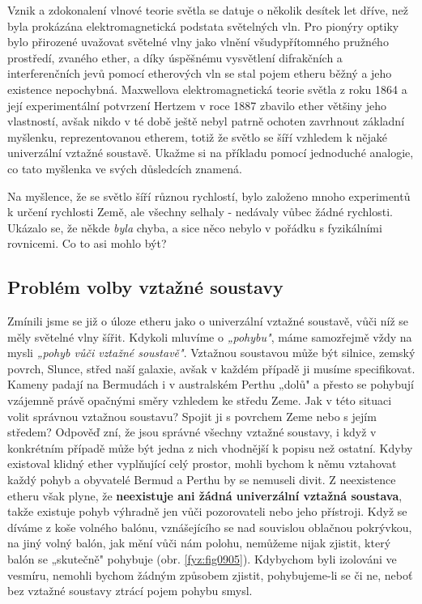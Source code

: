     \begin{tcnote}        
      Vznik a zdokonalení vlnové teorie světla se datuje o několik desítek let dříve, než byla
      prokázána elektromagnetická podstata světelných vln. Pro pionýry optiky bylo přirozené
      uvažovat světelné vlny jako vlnění všudypřítomného pružného prostředí, zvaného ether, a díky
      úspěšnému vysvětlení difrakčních a interferenčních jevů pomocí etherových vln se stal pojem
      etheru běžný a jeho existence nepochybná. Maxwellova elektromagnetická teorie světla z roku
      1864 a její experimentální potvrzení Hertzem v roce 1887 zbavilo ether většiny jeho
      vlastností, avšak nikdo v té době ještě nebyl patrně ochoten zavrhnout základní myšlenku,
      reprezentovanou etherem, totiž že světlo se šíří vzhledem k nějaké univerzální vztažné
      soustavě. Ukažme si na příkladu pomocí jednoduché analogie, co tato myšlenka ve svých
      důsledcích znamená.
    \end{tcnote}

    Na myšlence, že se světlo šíří různou rychlostí, bylo založeno mnoho experimentů k určení
    rychlosti Země, ale všechny selhaly - nedávaly vůbec žádné rychlosti. Ukázalo se, že někde
    \emph{byla} chyba, a sice něco nebylo v pořádku s fyzikálními rovnicemi. Co to asi mohlo být?

    \subsection{Problém volby vztažné soustavy}
      Zmínili jsme se již o úloze etheru jako o univerzální vztažné soustavě, vůči níž se měly
      světelné vlny šířit. Kdykoli mluvíme o \emph{„pohybu"}, máme samozřejmě vždy na mysli
      \emph{„pohyb vůči vztažné soustavě"}. Vztažnou soustavou může být silnice, zemský povrch,
      Slunce, střed naší galaxie, avšak v každém případě ji musíme specifikovat. Kameny padají na
      Bermudách i v australském Perthu „dolů" a přesto se pohybují vzájemně právě opačnými směry
      vzhledem ke středu Zeme. Jak v této situaci volit správnou vztažnou soustavu? Spojit ji s
      povrchem Zeme nebo s jejím středem? Odpověď zní, že jsou správné všechny vztažné soustavy, i
      když v konkrétním případě může být jedna z nich vhodnější k popisu než ostatní. Kdyby
      existoval klidný ether vyplňující celý prostor, mohli bychom k němu vztahovat každý pohyb a
      obyvatelé Bermud a Perthu by se nemuseli divit. Z neexistence etheru však plyne, že
      \textbf{neexistuje ani žádná univerzální vztažná soustava}, takže existuje pohyb výhradně jen
      vůči pozorovateli nebo jeho přístroji. Když se díváme z koše volného balónu, vznášejícího se
      nad souvislou oblačnou pokrývkou, na jiný volný balón, jak mění vůči nám polohu, nemůžeme
      nijak zjistit, který balón se „skutečně" pohybuje (obr. \ref{fyz:fig0905}). Kdybychom byli
      izolováni ve vesmíru, nemohli bychom žádným způsobem zjistit, pohybujeme-li se či ne, neboť
      bez vztažné soustavy ztrácí pojem pohybu smysl.

